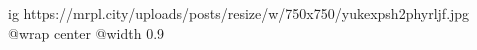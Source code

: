  
 
 
 
 

\ifcmt
  ig https://mrpl.city/uploads/posts/resize/w/750x750/yukexpsh2phyrljf.jpg
  @wrap center
  @width 0.9
\fi
